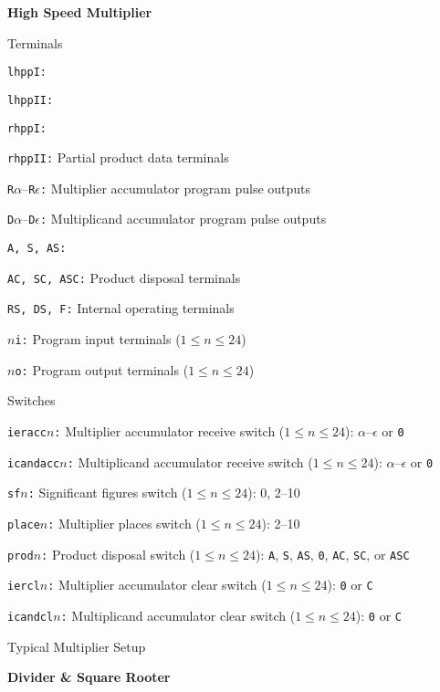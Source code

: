 \vfill\eject
\noindent
{\bf High Speed Multiplier}

Terminals

{\advance\leftskip 1in
\item{\tt lhppI:}
\item{\tt lhppII:}
\item{\tt rhppI:}
\item{\tt rhppII:} Partial product data terminals
\item{{\tt R$\alpha$}--{\tt R$\epsilon$:}} Multiplier accumulator program pulse outputs
\item{{\tt D$\alpha$}--{\tt D$\epsilon$:}} Multiplicand accumulator program pulse outputs
\item{\tt A, S, AS:}
\item{\tt AC, SC, ASC:} Product disposal terminals
\item{\tt RS, DS, F:} Internal operating terminals
\item{\tt $n$i:} Program input terminals ($1\le n \le 24$)
\item{\tt $n$o:} Program output terminals ($1\le n \le 24$)

}


\vskip 6pt
Switches

{\advance\leftskip 1in
\item{\tt ieracc$n$:} Multiplier accumulator receive switch ($1\le n\le 24$): $\alpha$--$\epsilon$ or {\tt 0}
\item{\tt icandacc$n$:} Multiplicand accumulator receive switch
($1\le n\le 24$): $\alpha$--$\epsilon$ or {\tt 0}
\item{\tt sf$n$:} Significant figures switch ($1\le n\le 24$): 0, 2--10
\item{\tt place$n$:} Multiplier places switch ($1\le n\le 24$): 2--10
\item{\tt prod$n$:} Product disposal switch ($1\le n\le 24$): {\tt A}, {\tt S}, {\tt AS}, {\tt 0},
{\tt AC}, {\tt SC}, or {\tt ASC}
\item{\tt iercl$n$:} Multiplier accumulator clear switch ($1\le n\le 24$): {\tt 0} or {\tt C}
\item{\tt icandcl$n$:} Multiplicand accumulator clear switch ($1\le n\le 24$): {\tt 0} or {\tt C}

}

\vskip 6pt
Typical Multiplier Setup

\vfill\eject
\noindent
{\bf Divider \& Square Rooter}

